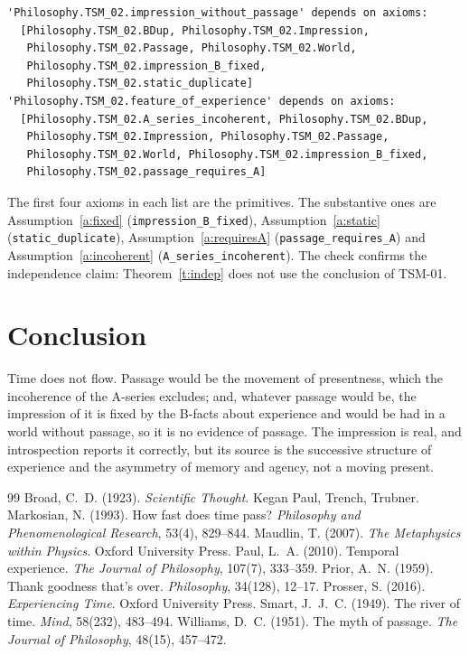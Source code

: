 \documentclass{situationist-preprint}
\begin{document}
\begin{lstlisting}
'Philosophy.TSM_02.impression_without_passage' depends on axioms:
  [Philosophy.TSM_02.BDup, Philosophy.TSM_02.Impression,
   Philosophy.TSM_02.Passage, Philosophy.TSM_02.World,
   Philosophy.TSM_02.impression_B_fixed,
   Philosophy.TSM_02.static_duplicate]
'Philosophy.TSM_02.feature_of_experience' depends on axioms:
  [Philosophy.TSM_02.A_series_incoherent, Philosophy.TSM_02.BDup,
   Philosophy.TSM_02.Impression, Philosophy.TSM_02.Passage,
   Philosophy.TSM_02.World, Philosophy.TSM_02.impression_B_fixed,
   Philosophy.TSM_02.passage_requires_A]
\end{lstlisting}

The first four axioms in each list are the primitives. The substantive ones are Assumption~\ref{a:fixed} (\texttt{impression\_B\_fixed}), Assumption~\ref{a:static} (\texttt{static\_duplicate}), Assumption~\ref{a:requiresA} (\texttt{passage\_requires\_A}) and Assumption~\ref{a:incoherent} (\texttt{A\_series\_incoherent}). The check confirms the independence claim: Theorem~\ref{t:indep} does not use the conclusion of TSM-01.

\section{Conclusion}

Time does not flow. Passage would be the movement of presentness, which the incoherence of the A-series excludes; and, whatever passage would be, the impression of it is fixed by the B-facts about experience and would be had in a world without passage, so it is no evidence of passage. The impression is real, and introspection reports it correctly, but its source is the successive structure of experience and the asymmetry of memory and agency, not a moving present.

\begin{thebibliography}{99}\small
{} Broad, C.~D. (1923). \emph{Scientific Thought}. Kegan Paul, Trench, Trubner.
 Markosian, N. (1993). How fast does time pass? \emph{Philosophy and Phenomenological Research}, 53(4), 829--844.
 Maudlin, T. (2007). \emph{The Metaphysics within Physics}. Oxford University Press.
 Paul, L.~A. (2010). Temporal experience. \emph{The Journal of Philosophy}, 107(7), 333--359.
 Prior, A.~N. (1959). Thank goodness that's over. \emph{Philosophy}, 34(128), 12--17.
 Prosser, S. (2016). \emph{Experiencing Time}. Oxford University Press.
 Smart, J.~J.~C. (1949). The river of time. \emph{Mind}, 58(232), 483--494.
 Williams, D.~C. (1951). The myth of passage. \emph{The Journal of Philosophy}, 48(15), 457--472.
\end{thebibliography}
\end{document}
